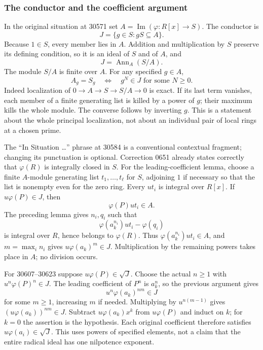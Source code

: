 \subsubsection{The conductor and the coefficient argument}\label{the-conductor-and-the-coefficient-argument}

In the original situation at 30571 set \(A=\operatorname{Im}(\varphi:R[x]\to S)\). The conductor is \[
 J=\{g\in S:gS\subseteq A\}.
\] Because \(1\in S\), every member lies in \(A\). Addition and multiplication by \(S\) preserve its defining condition, so it is an ideal of \(S\) and of \(A\), and \[
 J=\operatorname{Ann}_A(S/A).
\] The module \(S/A\) is finite over \(A\). For any specified \(g\in A\), \[
 A_g=S_g\quad\Longleftrightarrow\quad
                  g^N\in J\text{ for some }N\geq0.
\] Indeed localization of \(0\to A\to S\to S/A\to0\) is exact. If its last term vanishes, each member of a finite generating list is killed by a power of \(g\); their maximum kills the whole module. The converse follows by inverting \(g\). This is a statement about the whole principal localization, not about an individual pair of local rings at a chosen prime.

The ``In Situation \ldots'' phrase at 30584 is a conventional contextual fragment; changing its punctuation is optional. Correction 0651 already states correctly that \(\varphi(R)\) is integrally closed in \(S\). For the leading-coefficient lemma, choose a finite \(A\)-module generating list \(t_1,\ldots,t_\ell\) for \(S\), adjoining \(1\) if necessary so that the list is nonempty even for the zero ring. Every \(ut_i\) is integral over \(R[x]\). If \(u\varphi(P)\in J\), then \[
 \varphi(P)ut_i\in A.
\] The preceding lemma gives \(n_i,q_i\) such that \[
 \varphi(a_k^{n_i})ut_i-\varphi(q_i)
\] is integral over \(R\), hence belongs to \(\varphi(R)\). Thus \(\varphi(a_k^{n_i})ut_i\in A\), and \(m=\max_i n_i\) gives \(u\varphi(a_k)^m\in J\). Multiplication by the remaining powers takes place in \(A\); no division occurs.

For 30607--30623 suppose \(u\varphi(P)\in\sqrt J\). Choose the actual \(n\geq1\) with \(u^n\varphi(P)^n\in J\). The leading coefficient of \(P^n\) is \(a_k^n\), so the previous argument gives \[
 u^n\varphi(a_k)^{nm}\in J
\] for some \(m\geq1\), increasing \(m\) if needed. Multiplying by \(u^{n(m-1)}\) gives \((u\varphi(a_k))^{nm}\in J\). Subtract \(u\varphi(a_k)x^k\) from \(u\varphi(P)\) and induct on \(k\); for \(k=0\) the assertion is the hypothesis. Each original coefficient therefore satisfies \(u\varphi(a_i)\in\sqrt J\). This uses powers of specified elements, not a claim that the entire radical ideal has one nilpotence exponent.

